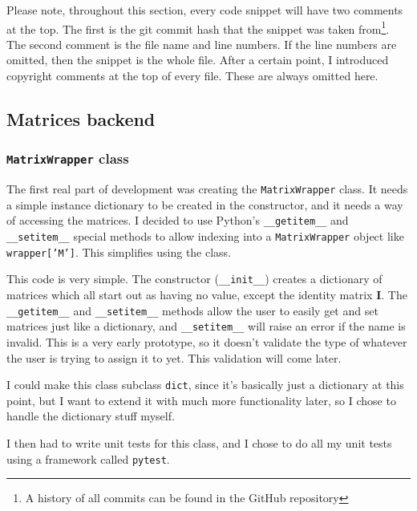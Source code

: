 \documentclass[../main.tex]{subfiles}
\begin{document}
Please note, throughout this section, every code snippet will have two comments at the top. The first is the git commit hash that the snippet was taken from\footnote{A history of all commits can be found in the GitHub repository\cite{lintrans-github}}. The second comment is the file name and line numbers. If the line numbers are omitted, then the snippet is the whole file. After a certain point, I introduced copyright comments at the top of every file. These are always omitted here.

\subsection{Matrices backend\label{subsection:development:matrices-backend}}

\subsubsection{\texttt{MatrixWrapper} class}

The first real part of development was creating the \texttt{MatrixWrapper} class. It needs a simple instance dictionary to be created in the constructor, and it needs a way of accessing the matrices. I decided to use Python's \texttt{\_\_getitem\_\_} and \texttt{\_\_setitem\_\_} special methods\cite{python-3-special-methods} to allow indexing into a \texttt{MatrixWrapper} object like \texttt{wrapper['M']}. This simplifies using the class.


This code is very simple. The constructor (\texttt{\_\_init\_\_}) creates a dictionary of matrices which all start out as having no value, except the identity matrix \textbf{I}. The \texttt{\_\_getitem\_\_} and \texttt{\_\_setitem\_\_} methods allow the user to easily get and set matrices just like a dictionary, and \texttt{\_\_setitem\_\_} will raise an error if the name is invalid. This is a very early prototype, so it doesn't validate the type of whatever the user is trying to assign it to yet. This validation will come later.

I could make this class subclass \texttt{dict}, since it's basically just a dictionary at this point, but I want to extend it with much more functionality later, so I chose to handle the dictionary stuff myself.

I then had to write unit tests for this class, and I chose to do all my unit tests using a framework called \texttt{pytest}.
\end{document}
